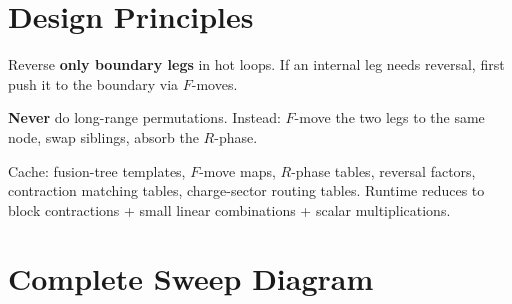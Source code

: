 \documentclass[11pt,a4paper]{article}
\begin{document}
\section{Design Principles}
\label{sec:principles}

\begin{rulebox}
Reverse \textbf{only boundary legs} in hot loops.  If an internal leg needs
reversal, first push it to the boundary via $F$-moves.
\end{rulebox}

\begin{rulebox}
\textbf{Never} do long-range permutations.  Instead:
$F$-move the two legs to the same node, swap siblings, absorb the $R$-phase.
\end{rulebox}

\begin{rulebox}[Precomputation]
Cache: fusion-tree templates, $F$-move maps, $R$-phase tables, reversal factors,
contraction matching tables, charge-sector routing tables.
Runtime reduces to block contractions + small linear combinations + scalar multiplications.
\end{rulebox}


\section{Complete Sweep Diagram}
\label{sec:sweep}
\end{document}
